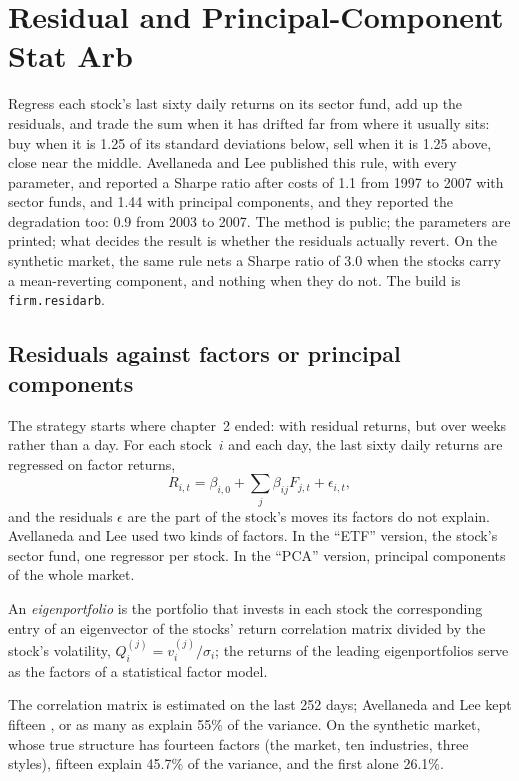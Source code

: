 \chapter{Residual and Principal-Component Stat Arb}\label{ch:s1:residual-and-principal-component-stat-arb}

Regress each stock's last sixty daily returns on its sector fund, add up the residuals, and trade the sum when it has drifted far from where it usually sits:
buy when it is 1.25 of its standard deviations below, sell when it is 1.25 above, close near the middle. Avellaneda and Lee published this rule, with every
parameter, and reported a Sharpe ratio after costs of 1.1 from 1997 to 2007 with sector funds, and 1.44 with principal components, and they reported the
degradation too: 0.9 from 2003 to 2007. The method is public; the parameters are printed; what decides the result is whether the residuals actually revert.
On the synthetic market, the same rule nets a Sharpe ratio of 3.0 when the stocks carry a mean-reverting component, and nothing when they do not. The build is
\texttt{firm.residarb}.

\section{Residuals against factors or principal components}

The strategy starts where chapter~2 ended: with residual returns, but over weeks rather than a day. For each stock~$i$ and each day, the last sixty daily
returns are regressed on factor returns,
\[
R_{i,t} = \beta_{i,0} + \sum_j \beta_{ij} F_{j,t} + \epsilon_{i,t},
\]
and the residuals $\epsilon$ are the part of the stock's moves its factors do not explain. Avellaneda and Lee used two kinds of factors. In the ``ETF'' version,
the stock's sector fund, one regressor per stock. In the ``PCA'' version, principal components of the whole market.

\begin{definition}[Eigenportfolio]\label{def:s1:residual-and-principal-component-stat-arb:eigenportfolio}
An \emph{eigenportfolio} is the portfolio that invests in each stock the corresponding entry of an eigenvector of the stocks' return
correlation matrix divided by the stock's volatility, $Q^{(j)}_i = v^{(j)}_i/\sigma_i$; the returns of the leading eigenportfolios serve as the factors of a
statistical factor model.
\end{definition}

The correlation matrix is estimated on the last 252 days; Avellaneda and Lee kept fifteen , or as many as explain 55\% of the variance. On the
synthetic market, whose true structure has fourteen factors (the market, ten industries, three styles), fifteen  explain 45.7\% of the
variance, and the first alone 26.1\%.

